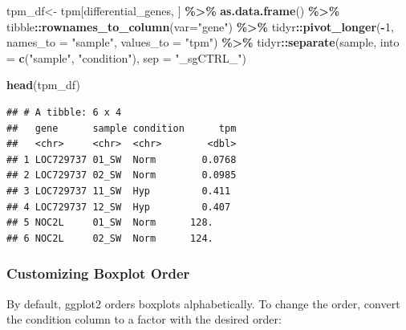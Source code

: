 \documentclass[
]{book}
\newenvironment{Shaded}{\begin{snugshade}}{\end{snugshade}}
\newcommand{\AttributeTok}[1]{\textcolor[rgb]{0.13,0.29,0.53}{#1}}
\newcommand{\CommentTok}[1]{\textcolor[rgb]{0.56,0.35,0.01}{\textit{#1}}}
\newcommand{\DecValTok}[1]{\textcolor[rgb]{0.00,0.00,0.81}{#1}}
\newcommand{\FunctionTok}[1]{\textcolor[rgb]{0.13,0.29,0.53}{\textbf{#1}}}
\newcommand{\NormalTok}[1]{#1}
\newcommand{\OtherTok}[1]{\textcolor[rgb]{0.56,0.35,0.01}{#1}}
\newcommand{\SpecialCharTok}[1]{\textcolor[rgb]{0.81,0.36,0.00}{\textbf{#1}}}
\newcommand{\StringTok}[1]{\textcolor[rgb]{0.31,0.60,0.02}{#1}}
\begin{document}
\begin{Shaded}
\begin{Highlighting}[]
\NormalTok{tpm\_df}\OtherTok{\textless{}{-}}\NormalTok{ tpm[differential\_genes, ] }\SpecialCharTok{\%\textgreater{}\%}
  \FunctionTok{as.data.frame}\NormalTok{() }\SpecialCharTok{\%\textgreater{}\%}
\NormalTok{  tibble}\SpecialCharTok{::}\FunctionTok{rownames\_to\_column}\NormalTok{(}\AttributeTok{var=}\StringTok{"gene"}\NormalTok{) }\SpecialCharTok{\%\textgreater{}\%}
\NormalTok{  tidyr}\SpecialCharTok{::}\FunctionTok{pivot\_longer}\NormalTok{(}\SpecialCharTok{{-}}\DecValTok{1}\NormalTok{, }\AttributeTok{names\_to =} \StringTok{"sample"}\NormalTok{, }\AttributeTok{values\_to =} \StringTok{"tpm"}\NormalTok{) }\SpecialCharTok{\%\textgreater{}\%}
\NormalTok{  tidyr}\SpecialCharTok{::}\FunctionTok{separate}\NormalTok{(sample, }\AttributeTok{into =} \FunctionTok{c}\NormalTok{(}\StringTok{"sample"}\NormalTok{, }\StringTok{"condition"}\NormalTok{), }\AttributeTok{sep =} \StringTok{"\_sgCTRL\_"}\NormalTok{)}

\FunctionTok{head}\NormalTok{(tpm\_df)}
\end{Highlighting}
\end{Shaded}

\begin{verbatim}
## # A tibble: 6 x 4
##   gene      sample condition      tpm
##   <chr>     <chr>  <chr>        <dbl>
## 1 LOC729737 01_SW  Norm        0.0768
## 2 LOC729737 02_SW  Norm        0.0985
## 3 LOC729737 11_SW  Hyp         0.411 
## 4 LOC729737 12_SW  Hyp         0.407 
## 5 NOC2L     01_SW  Norm      128.    
## 6 NOC2L     02_SW  Norm      124.
\end{verbatim}

\hypertarget{customizing-boxplot-order}{%
\subsubsection{Customizing Boxplot Order}\label{customizing-boxplot-order}}

By default, ggplot2 orders boxplots alphabetically. To change the order, convert the condition column to a factor with the desired order:

\begin{Shaded}
\end{Shaded}
\end{document}
